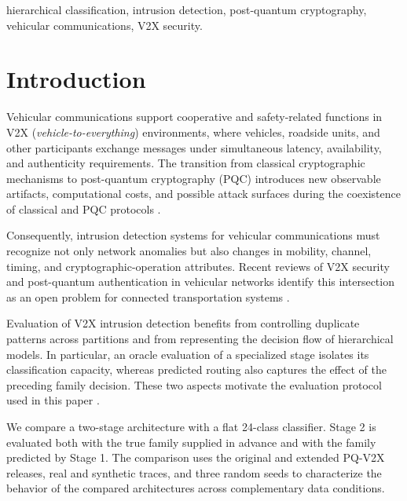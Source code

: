 \documentclass{IEEEoj}
\begin{document}
\begin{IEEEkeywords}
hierarchical classification, intrusion detection, post-quantum cryptography, vehicular communications, V2X security.
\end{IEEEkeywords}

\maketitle

\section{Introduction}

Vehicular communications support cooperative and safety-related functions in
V2X (\textit{vehicle-to-everything}) environments, where vehicles, roadside
units, and other participants exchange messages under simultaneous latency,
availability, and authenticity requirements\cite{105018710169,105006773029,105042709447}. The transition
from classical cryptographic mechanisms to post-quantum cryptography (PQC)
introduces new observable artifacts, computational costs, and possible attack
surfaces during the coexistence of classical and PQC protocols
\cite{11170005,10838531,10199793,11310813}.

Consequently, intrusion detection systems for vehicular communications must
recognize not only network anomalies but also changes in mobility, channel,
timing, and cryptographic-operation attributes\cite{11351237,11125447,11308316}. Recent reviews of V2X security
and post-quantum authentication in vehicular networks identify this
intersection as an open problem for connected transportation systems
\cite{105006773029,105042709447}.

Evaluation of V2X intrusion detection benefits from controlling duplicate
patterns across partitions and from representing the decision flow of
hierarchical models. In particular, an oracle evaluation of a specialized
stage isolates its classification capacity, whereas predicted routing also
captures the effect of the preceding family decision. These two aspects
motivate the evaluation protocol used in this paper
\cite{105006773029,S1570870525002306,105045590822}.

We compare a two-stage architecture with a flat 24-class classifier. Stage 2
is evaluated both with the true family supplied in advance and with the family
predicted by Stage 1. The comparison uses the original and extended PQ-V2X
releases, real and synthetic traces, and three random seeds to characterize the
behavior of the compared architectures across complementary data conditions.
\end{document}
